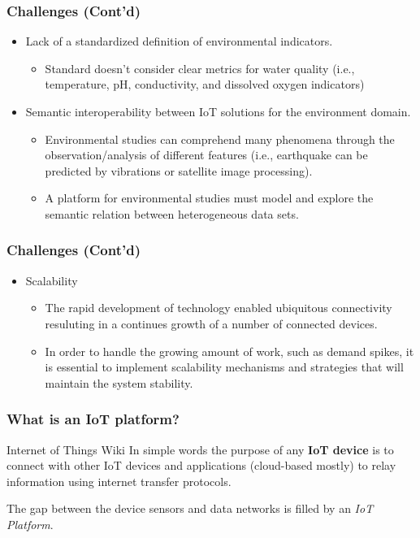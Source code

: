 \documentclass{../iot-lecture}
\begin{document}
\begin{frame}
  \frametitle{Challenges (Cont'd)}
  \begin{itemize}
    \item Lack of a standardized definition of environmental indicators.
    \begin{itemize}
      \item Standard doesn't consider clear metrics for water quality (i.e., temperature, pH, conductivity, and dissolved oxygen indicators)
    \end{itemize}
    \item Semantic interoperability between IoT solutions for the environment domain.
    \begin{itemize}
      \item Environmental studies can comprehend many phenomena through the observation/analysis of different features
        (i.e., earthquake can be predicted by vibrations or satellite image processing).
      \item A platform for environmental studies must model and explore the semantic relation between heterogeneous data sets.
    \end{itemize}
  \end{itemize}
\end{frame}

\begin{frame}
  \frametitle{Challenges (Cont'd)}
  \begin{itemize}
    \item Scalability
    \begin{itemize}
      \item The rapid development of technology enabled ubiquitous connectivity resuluting in a continues growth of a number of connected devices.
      \item In order to handle the growing amount of work, such as demand spikes, it is essential to implement scalability mechanisms and strategies that will maintain the system stability.
    \end{itemize}
  \end{itemize}
\end{frame}

\begin{frame}
  \frametitle{What is an IoT platform?}
  \begin{block}{Internet of Things Wiki}
    In simple words the purpose of any \textbf{\color{YellowOrange} IoT device} is to connect with
    other IoT devices and applications (cloud-based mostly) to relay
    information using internet transfer protocols.

    The gap between the device sensors and data networks is filled
    by an \textit{\color{Green} IoT Platform}.
  \end{block}
\end{frame}
\end{document}
